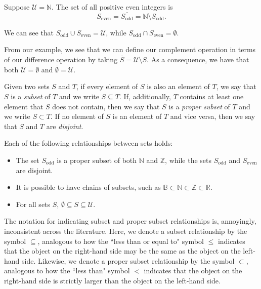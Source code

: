 \begin{example}
Suppose $\mathcal{U} = \mathbb{N}$. The set of all positive even integers is
\begin{equation*}
S_{\text{even}} = \overline{S_{\text{odd}}} = \mathbb{N} \setminus S_{\text{odd}}.
\end{equation*}

\noindent
We can see that $S_{\text{odd}} \cup S_{\text{even}} = \mathcal{U}$, while $S_{\text{odd}} \cap S_{\text{even}} = \emptyset$.
\end{example}

From our example, we see that we can define our complement operation in terms of our difference operation by taking $\overline{S} = \mathcal{U} \setminus S$. As a consequence, we have that both $\overline{\mathcal{U}} = \emptyset$ and $\overline{\emptyset} = \mathcal{U}$.

Given two sets $S$ and $T$, if every element of $S$ is also an element of $T$, we say that $S$ is a \emph{subset} of $T$ and we write $S \subseteq T$. If, additionally, $T$ contains at least one element that $S$ does not contain, then we say that $S$ is a \emph{proper subset} of $T$ and we write $S \subset T$. If no element of $S$ is an element of $T$ and vice versa, then we say that $S$ and $T$ are \emph{disjoint}.

\begin{example}
Each of the following relationships between sets holds:
\begin{itemize}
	\item The set $S_{\text{odd}}$ is a proper subset of both $\mathbb{N}$ and $\mathbb{Z}$, while the sets $S_{\text{odd}}$ and $S_{\text{even}}$ are disjoint.

	\item It is possible to have chains of subsets, such as $\mathbb{B} \subset \mathbb{N} \subset \mathbb{Z} \subset \mathbb{R}$.

	\item For all sets $S$, $\emptyset \subseteq S \subseteq \mathcal{U}$.
\end{itemize}
\end{example}

\begin{remark}
The notation for indicating subset and proper subset relationships is, annoyingly, inconsistent across the literature. Here, we denote a subset relationship by the symbol $\subseteq$, analogous to how the ``less than or equal to" symbol $\leq$ indicates that the object on the right-hand side may be the same as the object on the left-hand side. Likewise, we denote a proper subset relationship by the symbol $\subset$, analogous to how the ``less than" symbol $<$ indicates that the object on the right-hand side is strictly larger than the object on the left-hand side.
\end{remark}

